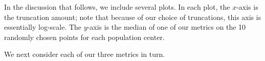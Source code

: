 \documentclass[10pt, conference, compsocconf]{IEEEtran}
\newcommand{\cdiff}{\delta}
\begin{document}
In the discussion that follows, we include several plots. In each
plot, the $x$-axis is the truncation amount; note that because of our
choice of truncations, this axis is essentially log-scale.  The $y$-axis
is the median of one of our metrics on the 10 randomly chosen points
for each population center.







We next consider each of our three metrics in turn.
\end{document}
